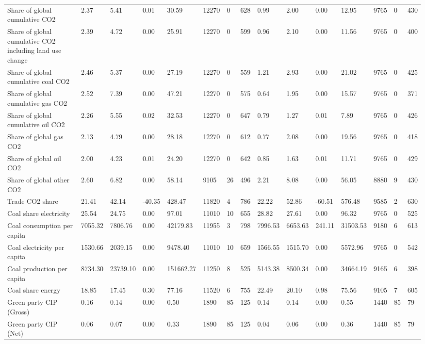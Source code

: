 \begin{longtable}{lllllllllllllll}
Share of global cumulative CO2 & 2.37 & 5.41 & 0.01 & 30.59 & 12270 & 0 & 628 & 0.99 & 2.00 & 0.00 & 12.95 & 9765 & 0 & 430\\
Share of global cumulative CO2 including land use change & 2.39 & 4.72 & 0.00 & 25.91 & 12270 & 0 & 599 & 0.96 & 2.10 & 0.00 & 11.56 & 9765 & 0 & 400\\
Share of global cumulative coal CO2 & 2.46 & 5.37 & 0.00 & 27.19 & 12270 & 0 & 559 & 1.21 & 2.93 & 0.00 & 21.02 & 9765 & 0 & 425\\
Share of global cumulative gas CO2 & 2.52 & 7.39 & 0.00 & 47.21 & 12270 & 0 & 575 & 0.64 & 1.95 & 0.00 & 15.57 & 9765 & 0 & 371\\
\addlinespace
Share of global cumulative oil CO2 & 2.26 & 5.55 & 0.02 & 32.53 & 12270 & 0 & 647 & 0.79 & 1.27 & 0.01 & 7.89 & 9765 & 0 & 426\\
Share of global gas CO2 & 2.13 & 4.79 & 0.00 & 28.18 & 12270 & 0 & 612 & 0.77 & 2.08 & 0.00 & 19.56 & 9765 & 0 & 418\\
Share of global oil CO2 & 2.00 & 4.23 & 0.01 & 24.20 & 12270 & 0 & 642 & 0.85 & 1.63 & 0.01 & 11.71 & 9765 & 0 & 429\\
Share of global other CO2 & 2.60 & 6.82 & 0.00 & 58.14 & 9105 & 26 & 496 & 2.21 & 8.08 & 0.00 & 56.05 & 8880 & 9 & 430\\
Trade CO2 share & 21.41 & 42.14 & -40.35 & 428.47 & 11820 & 4 & 786 & 22.22 & 52.86 & -60.51 & 576.48 & 9585 & 2 & 630\\
\addlinespace
Coal share electricity & 25.54 & 24.75 & 0.00 & 97.01 & 11010 & 10 & 655 & 28.82 & 27.61 & 0.00 & 96.32 & 9765 & 0 & 525\\
Coal consumption per capita & 7055.32 & 7806.76 & 0.00 & 42179.83 & 11955 & 3 & 798 & 7996.53 & 6653.63 & 241.11 & 31503.53 & 9180 & 6 & 613\\
Coal electricity per capita & 1530.66 & 2039.15 & 0.00 & 9478.40 & 11010 & 10 & 659 & 1566.55 & 1515.70 & 0.00 & 5572.96 & 9765 & 0 & 542\\
Coal production per capita & 8734.30 & 23739.10 & 0.00 & 151662.27 & 11250 & 8 & 525 & 5143.38 & 8500.34 & 0.00 & 34664.19 & 9165 & 6 & 398\\
Coal share energy & 18.85 & 17.45 & 0.30 & 77.16 & 11520 & 6 & 755 & 22.49 & 20.10 & 0.98 & 75.56 & 9105 & 7 & 605\\
\addlinespace
Green party CIP (Gross) & 0.16 & 0.14 & 0.00 & 0.50 & 1890 & 85 & 125 & 0.14 & 0.14 & 0.00 & 0.55 & 1440 & 85 & 79\\
Green party CIP (Net) & 0.06 & 0.07 & 0.00 & 0.33 & 1890 & 85 & 125 & 0.04 & 0.06 & 0.00 & 0.36 & 1440 & 85 & 79\\

\end{longtable}
